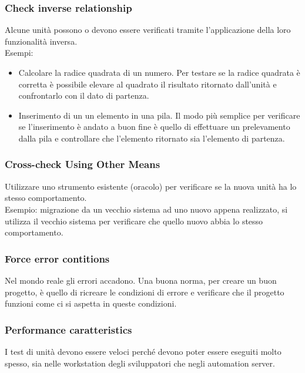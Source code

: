 \documentclass[10pt, a4paper]{article}
\begin{document}
\subsubsection*{Check inverse relationship}
Alcune unità possono o devono essere verificati tramite l'applicazione della loro
funzionalità inversa.\\
Esempi:
\begin{itemize}
\item Calcolare la radice quadrata di un numero. Per testare se la radice quadrata è corretta è
possibile elevare al quadrato il risultato ritornato dall'unità e confrontarlo con il dato di
partenza.
\item Inserimento di un un elemento in una pila. Il modo più semplice per verificare se
l'inserimento è andato a buon fine è quello di effettuare un prelevamento dalla pila e
controllare che l'elemento ritornato sia l'elemento di partenza.
\end{itemize}

\subsubsection*{Cross-check Using Other Means}
Utilizzare uno strumento esistente (oracolo) per verificare se la nuova unità ha lo stesso
comportamento.\\
Esempio: migrazione da un vecchio sistema ad uno nuovo appena realizzato,
si utilizza il vecchio sistema per verificare che quello nuovo abbia lo stesso
comportamento.

\subsubsection*{Force error contitions}
Nel mondo reale gli errori accadono. Una buona norma, per creare un buon progetto, è
quello di ricreare le condizioni di errore e verificare che il progetto funzioni come ci si
aspetta in queste condizioni.

\subsubsection*{Performance caratteristics}
I test di unità devono essere veloci perché devono poter essere eseguiti molto spesso, sia nelle workstation degli sviluppatori che negli automation server.
\end{document}
